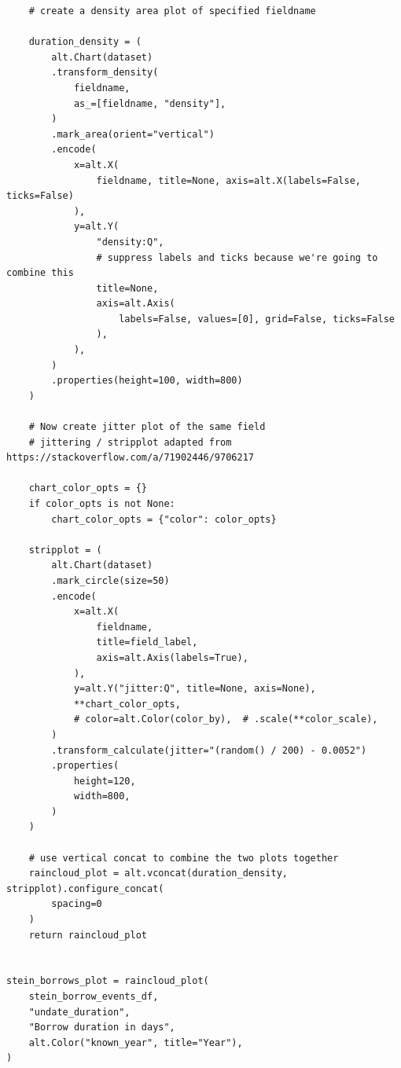 \documentclass[final]{anthology-ch} %
\begin{document}
\begin{verbatim}
    # create a density area plot of specified fieldname

    duration_density = (
        alt.Chart(dataset)
        .transform_density(
            fieldname,
            as_=[fieldname, "density"],
        )
        .mark_area(orient="vertical")
        .encode(
            x=alt.X(
                fieldname, title=None, axis=alt.X(labels=False, ticks=False)
            ),
            y=alt.Y(
                "density:Q",
                # suppress labels and ticks because we're going to combine this
                title=None,
                axis=alt.Axis(
                    labels=False, values=[0], grid=False, ticks=False
                ),
            ),
        )
        .properties(height=100, width=800)
    )

    # Now create jitter plot of the same field
    # jittering / stripplot adapted from https://stackoverflow.com/a/71902446/9706217

    chart_color_opts = {}
    if color_opts is not None:
        chart_color_opts = {"color": color_opts}

    stripplot = (
        alt.Chart(dataset)
        .mark_circle(size=50)
        .encode(
            x=alt.X(
                fieldname,
                title=field_label,
                axis=alt.Axis(labels=True),
            ),
            y=alt.Y("jitter:Q", title=None, axis=None),
            **chart_color_opts,
            # color=alt.Color(color_by),  # .scale(**color_scale),
        )
        .transform_calculate(jitter="(random() / 200) - 0.0052")
        .properties(
            height=120,
            width=800,
        )
    )

    # use vertical concat to combine the two plots together
    raincloud_plot = alt.vconcat(duration_density, stripplot).configure_concat(
        spacing=0
    )
    return raincloud_plot


stein_borrows_plot = raincloud_plot(
    stein_borrow_events_df,
    "undate_duration",
    "Borrow duration in days",
    alt.Color("known_year", title="Year"),
)

\end{verbatim}
\end{document}
